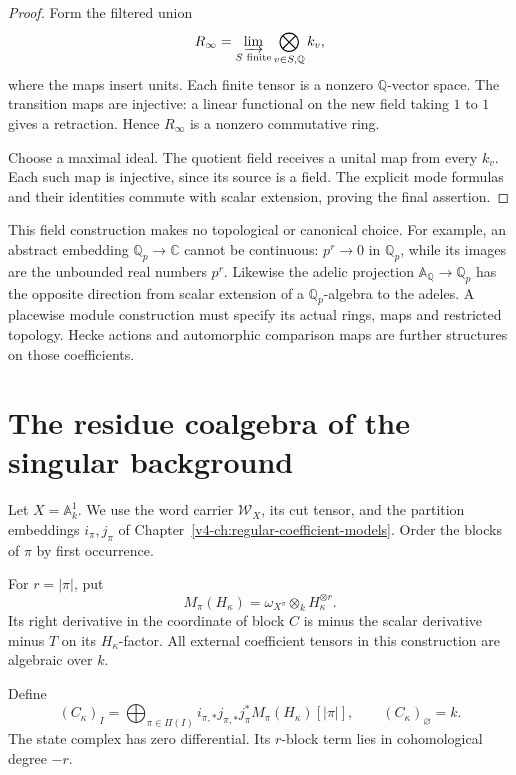 \begin{proof}
Form the filtered union
\[
                  R_\infty=\varinjlim_{S\text{ finite}}
                                 \bigotimes_{v\in S,\mathbb Q}k_v,
\]
where the maps insert units.
Each finite tensor is a nonzero
\(\mathbb Q\)-vector space.
The transition maps are injective:
a linear functional on the new field
taking \(1\) to \(1\) gives a retraction.
Hence \(R_\infty\) is a nonzero commutative ring.

Choose a maximal ideal.
The quotient field receives a unital
map from every \(k_v\).
Each such map is injective, since its
source is a field.
The explicit mode formulas and their
identities commute with scalar extension,
proving the final assertion.
\end{proof}

This field construction makes no topological
or canonical choice.
For example, an abstract embedding
\(\mathbb Q_p\to\mathbb C\) cannot be continuous:
\(p^r\to0\) in \(\mathbb Q_p\), while
its images are the unbounded real numbers \(p^r\).
Likewise the adelic projection
\(\mathbb A_{\mathbb Q}\to\mathbb Q_p\)
has the opposite direction from scalar extension
of a \(\mathbb Q_p\)-algebra to the adeles.
A placewise module construction must specify
its actual rings, maps and restricted topology.
Hecke actions and automorphic comparison maps
are further structures on those coefficients.

\section{The residue coalgebra of the singular background}
\label{v4-sec:singular-residue-coalgebra}

Let \(X=\mathbb A^1_k\). We use the word carrier
\(\mathcal W_X\), its cut tensor, and the partition
embeddings \(i_\pi,j_\pi\) of
Chapter~\ref{v4-ch:regular-coefficient-models}.
Order the blocks of \(\pi\) by first occurrence.

For \(r=|\pi|\), put
\[
 M_\pi(H_\kappa)=\omega_{X^\pi}\otimes_k H_\kappa^{\otimes r}.
\]
Its right derivative in the coordinate of block \(C\)
is minus the scalar derivative minus \(T\) on its
\(H_\kappa\)-factor. All external coefficient tensors
in this construction are algebraic over \(k\).

Define
\begin{equation}\label{v4-eq:singular-residue-object}
 (C_\kappa)_I
   =\bigoplus_{\pi\in\Pi(I)}
      i_{\pi,*}j_{\pi,*}j_\pi^*M_\pi(H_\kappa)[|\pi|],
 \qquad (C_\kappa)_\varnothing=k.
\end{equation}
The state complex has zero differential. Its \(r\)-block
term lies in cohomological degree \(-r\).

